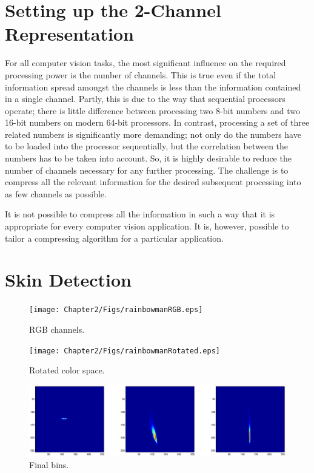 \section{Setting up the 2-Channel Representation}\label{sec:SettingUp2-ChannelRepresentation}

For all computer vision tasks, the most significant influence on the required processing power is the number of channels. This is true even if the total information spread amongst the channels is less than the information contained in a single channel. Partly, this is due to the way that sequential processors operate; there is little difference between processing two 8-bit numbers and two 16-bit numbers on modern 64-bit processors. In contrast, processing a set of three related numbers is significantly more demanding; not only do the numbers have to be loaded into the processor sequentially, but the correlation between the numbers has to be taken into account. So, it is highly desirable to reduce the number of channels necessary for any further processing. The challenge is to compress all the relevant information for the desired subsequent processing into as few channels as possible.

It is not possible to compress all the information in such a way that it is appropriate for every computer vision application. It is, however, possible to tailor a compressing algorithm for a particular application.


\section{Skin Detection}\label{sec:SkinDetection}


\begin{figure}[h!]
  \caption{RGB channels.}
  \centering
    \texttt{[image: Chapter2/Figs/rainbowmanRGB.eps]}
\end{figure}

\begin{figure}[h!]
  \caption{Rotated color space.}
  \centering
    \texttt{[image: Chapter2/Figs/rainbowmanRotated.eps]}
\end{figure}

\begin{figure}[h!]
  \caption{Final bins.}
  \centering
    \includegraphics[width=\textwidth]{Chapter2/Figs/binsFinal2.eps}
\end{figure}

